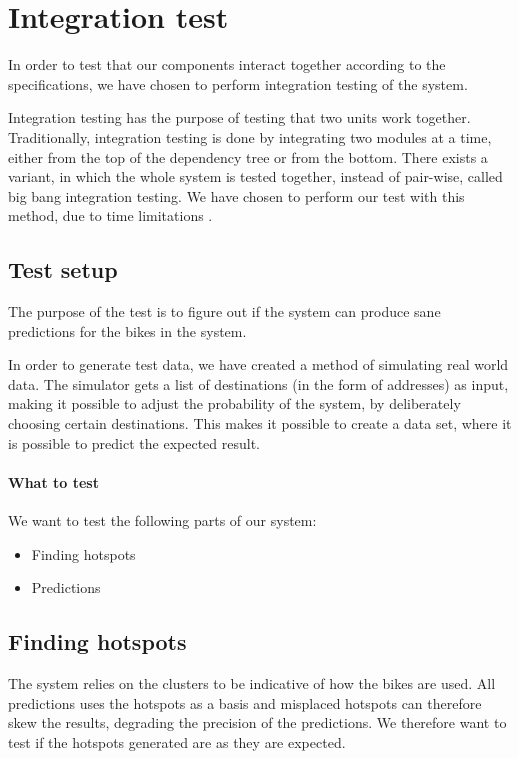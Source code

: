 \section{Integration test}

In order to test that our components interact together according to the specifications, we have chosen to perform integration testing of the system.

Integration testing has the purpose of testing that two units work together. 
Traditionally, integration testing is done by integrating two modules at a time, either from the top of the dependency tree or from the bottom.
There exists a variant, in which the whole system is tested together, instead of pair-wise, called big bang integration testing.
We have chosen to perform our test with this method, due to time limitations \cite{inttest}.

\subsection{Test setup}
The purpose of the test is to figure out if the system can produce sane predictions for the bikes in the system.


In order to generate test data, we have created a method of simulating real world data. 
The simulator gets a list of destinations (in the form of addresses) as input, making it possible to adjust the probability of the system, by deliberately choosing certain destinations.
This makes it possible to create a data set, where it is possible to predict the expected result.

\paragraph{What to test}
We want to test the following parts of our system:

\begin{itemize}
\item Finding hotspots
\item Predictions
\end{itemize}

\subsection{Finding hotspots}
The system relies on the clusters to be indicative of how the bikes are used. 
All predictions uses the hotspots as a basis and misplaced hotspots can therefore skew the results, degrading the precision of the predictions.
We therefore want to test if the hotspots generated are as they are expected.

